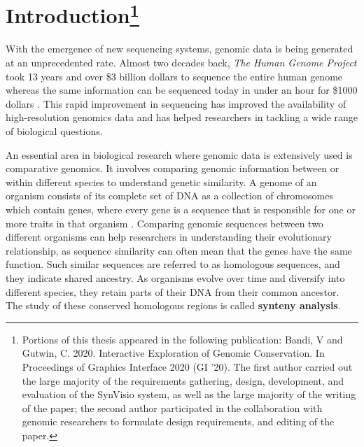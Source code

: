 \chapter[Introduction]{Introduction\footnote{Portions of this thesis appeared in the following publication: Bandi, V and Gutwin, C. 2020. Interactive Exploration of Genomic Conservation. In Proceedings of Graphics Interface 2020 (GI ’20). The first author carried out the large majority of the requirements gathering, design, development, and evaluation of the SynVisio system, as well as the large majority of the writing of the paper; the second author participated in the collaboration with genomic researchers to formulate design requirements, and editing of the paper.}}

With the emergence of new sequencing systems, genomic data is being generated at an unprecedented rate. Almost two decades back, \textit{The Human Genome Project} took 13 years and over \$3 billion dollars to sequence the entire human genome whereas the same information can be sequenced today in under an hour for \$1000 dollars \cite{genomegovHGP}. This rapid improvement in sequencing has improved the availability of high-resolution genomics data and has helped researchers in tackling a wide range of biological questions\cite{nielsen2010visualizing}.

An essential area in biological research where genomic data is extensively used is comparative genomics. It involves comparing genomic information between or within different species to understand genetic similarity. A genome of an organism consists of its complete set of DNA as a collection of chromosomes which contain genes, where every gene is a sequence that is responsible for one or more traits in that organism \cite{hartwell2008genetics}. Comparing genomic sequences between two different organisms can help researchers in understanding their evolutionary relationship, as sequence similarity can often mean that the genes have the same function. Such similar sequences are referred to as homologous sequences, and they indicate shared ancestry. As organisms evolve over time and diversify into different species, they retain parts of their DNA from their common ancestor. The study of these conserved homologous regions is called \textbf{synteny analysis}. 

